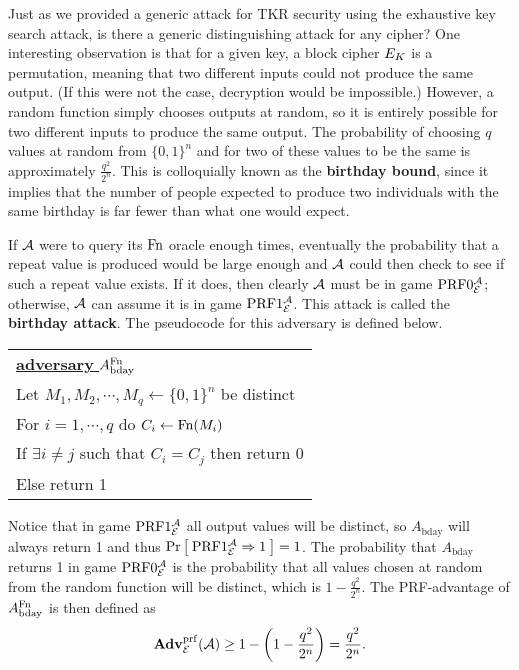 Just as we provided a generic attack for TKR security using the exhaustive key search attack, is there a generic distinguishing attack for any cipher? One interesting observation is that for a given key, a block cipher $E_K$ is a permutation, meaning that two different inputs could not produce the same output. (If this were not the case, decryption would be impossible.) However, a random function simply chooses outputs at random, so it is entirely possible for two different inputs to produce the same output. The probability of choosing $q$ values at random from $\{0,1\}^n$ and for two of these values to be the same is approximately $\frac{q^2}{2^n}$. This is colloquially known as the \textbf{birthday bound}, since it implies that the number of people expected to produce two individuals with the same birthday is far fewer than what one would expect. 

If ${\mathcal A}$ were to query its $\textnormal{Fn}$ oracle enough times, eventually the probability that a repeat value is produced would be large enough and ${\mathcal A}$ could then check to see if such a repeat value exists. If it does, then clearly ${\mathcal A}$ must be in game $\textnormal{PRF}0_{{\cal E}}^{\mathcal A}$; otherwise, ${\mathcal A}$ can assume it is in game $\textnormal{PRF}1_{{\cal E}}^{\mathcal A}$. This attack is called the \textbf{birthday attack}. The pseudocode for this adversary is defined below.
 
\begin{center}
\begin{tabular}{l}
	\underline{\textbf{adversary} $A^{\textnormal{Fn}}_{\text{bday}}$} \\
	Let $M_1, M_2, \cdots, M_q \gets \{0,1\}^n$ be distinct \\
	For $i=1, \cdots, q$ do $C_i \gets \textnormal{Fn}(M_i)$ \\
	If $\exists i \neq j$ such that $C_i = C_j$ then return 0 \\
	Else return 1
\end{tabular}
\end{center}

Notice that in game $\textnormal{PRF}1_{{\cal E}}^{\mathcal A}$ all output values will be distinct, so $A_{\text{bday}}$ will always return 1 and thus $\Pr\left[\: \textnormal{PRF}1_{\cal E}^{\mathcal A}\Rightarrow 1 \:\right]=1$. The probability that $A_{\text{bday}}$ returns 1 in game $\textnormal{PRF}0_{{\cal E}}^{\mathcal A}$ is the probability that all values chosen at random from the random function will be distinct, which is $1 - \frac{q^2}{2^n}$. The PRF-advantage of $A^{\textnormal{Fn}}_{\text{bday}}$ is then defined as 
\begin{equation*}
\mathbf{Adv}^{\mathrm{prf}}_{{\cal E}}({\mathcal A}) \geq 1 - \left(1 - \frac{q^2}{2^n}\right) = \frac{q^2}{2^n}.
\end{equation*}



